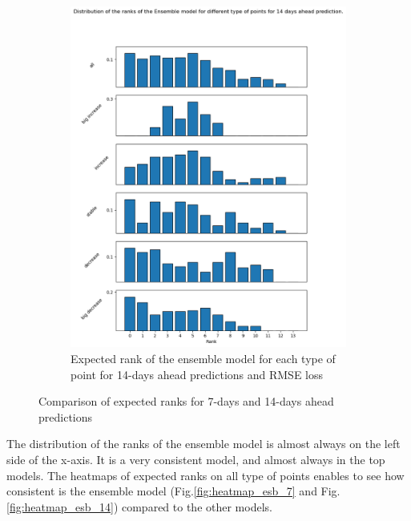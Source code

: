 \begin{figure}[htbp]
\begin{subfigure}[b]{0.45\textwidth}
        \includegraphics[width=\textwidth]{figures/esb_rank_14.png}
        \caption{Expected rank of the ensemble model for each type of point for 14-days ahead predictions and RMSE loss}
        \label{fig:esb_rank_14}
    \end{subfigure}
    \caption{Comparison of expected ranks for 7-days and 14-days ahead predictions}
    \label{fig:esb_rank_comparison}
\end{figure}

The distribution of the ranks of the ensemble model is almost always on the left side of the x-axis.
It is a very consistent model, and almost always in the top models. 
The heatmaps of expected ranks on all type of points enables to see how consistent is the ensemble model (Fig.\ref{fig:heatmap_esb_7} and Fig.\ref{fig:heatmap_esb_14}) compared to the other models. 


